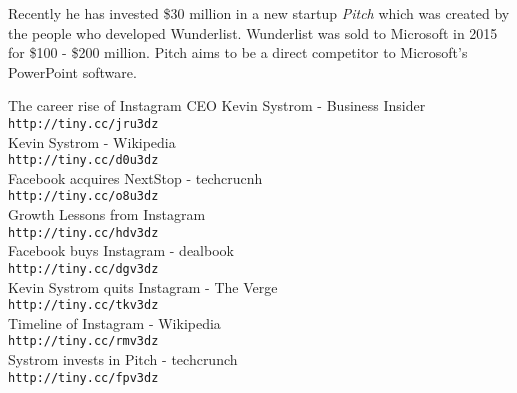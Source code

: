 \documentclass[12pt]{article}
\begin{document}
    Recently he has invested  \$30 million in a new startup \textit{Pitch} which was created by the people who developed Wunderlist.
    Wunderlist was sold to Microsoft in 2015 for \$100 - \$200 million. Pitch aims to be a direct competitor to Microsoft's PowerPoint software.

    \medskip
 
    \begin{thebibliography}{9}

        The career rise of Instagram CEO Kevin Systrom - Business Insider   
        \\\texttt{http://tiny.cc/jru3dz}
        \\
        Kevin Systrom - Wikipedia        
        \\\texttt{http://tiny.cc/d0u3dz}
        \\
        Facebook acquires NextStop - techcrucnh
        \\\texttt{http://tiny.cc/o8u3dz}
        \\
        Growth Lessons from Instagram        
        \\\texttt{http://tiny.cc/hdv3dz}
        \\
        Facebook buys Instagram - dealbook      
        \\\texttt{http://tiny.cc/dgv3dz}
        \\
        Kevin Systrom quits Instagram - The Verge
        \\\texttt{http://tiny.cc/tkv3dz}
        \\
        Timeline of Instagram - Wikipedia    
        \\\texttt{http://tiny.cc/rmv3dz}
        \\
        Systrom invests in Pitch - techcrunch
        \\\texttt{http://tiny.cc/fpv3dz}
        \\
    \end{thebibliography}
\end{document}

